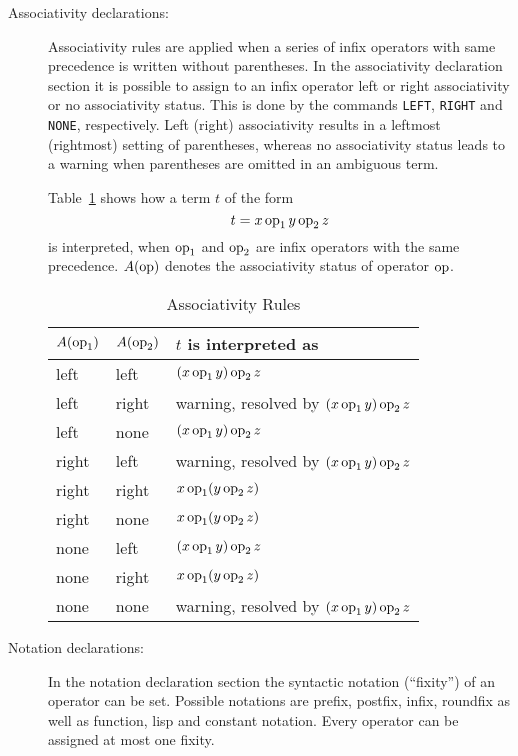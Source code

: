 \begin{description}
\item[Associativity declarations:]
Associativity rules are applied when a series of infix
operators with same precedence is written without parentheses.
In the associativity declaration section it is possible to assign to
an infix operator left or right associativity or no associativity status.
This is done by the commands {\tt LEFT}, {\tt RIGHT} and {\tt NONE},
respectively. Left (right) associativity results in a leftmost (rightmost) 
setting of parentheses, whereas no associativity status leads to a warning
when parentheses are omitted in an ambiguous term.

\def\op{\mathop{\rm op}\nolimits}

Table~\ref{assoc} shows how a term $t$ of the form 
$$ t = x \op_1 y \op_2 z $$
is interpreted, when $\op_1$ and $\op_2$ are infix operators with the same
precedence.
$A(\op)$ denotes the associativity status of operator $\op$.

\begin{table}[htbp]
\begin{center}
\begin{tabular}{|l|l|l|}
\hline
$A(\op_1)$ & $A(\op_2)$ & $t$ is interpreted as \\
\hline \hline
left  & left  & $(x \op_1 y) \op_2 z$ \\ \hline
left  & right & warning, resolved by $(x \op_1 y) \op_2 z$ \\ \hline
left  & none  & $(x \op_1 y) \op_2 z$ \\ \hline
right & left  & warning, resolved by $(x \op_1 y) \op_2 z$ \\ \hline
right & right & $x \op_1 (y \op_2 z)$ \\ \hline
right & none  & $x \op_1 (y \op_2 z)$ \\ \hline
none  & left  & $(x \op_1 y) \op_2 z$ \\ \hline
none  & right & $x \op_1 (y \op_2 z)$ \\ \hline
none  & none  & warning, resolved by $(x \op_1 y) \op_2 z$ \\ \hline
\end{tabular}
\end{center}
\caption{Associativity Rules}
\label{assoc}
\end{table} 

\item[Notation declarations:]
In the notation declaration section the syntactic notation (``fixity'')
of an operator can be set.
Possible notations are prefix, postfix, infix, roundfix as well as function, 
lisp and constant notation. 
Every operator can be assigned at most one fixity.


\end{description}
